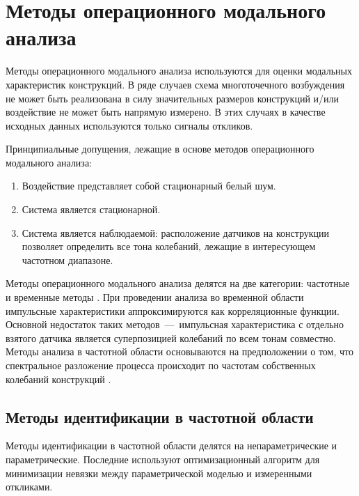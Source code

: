 \section{Методы операционного модального анализа}

Методы операционного модального анализа используются для оценки модальных характеристик конструкций. В ряде случаев схема многоточечного возбуждения не может быть реализована в силу значительных размеров конструкций и/или воздействие не может быть напрямую измерено. В этих случаях в качестве исходных данных используются только сигналы откликов. 

Принципиальные допущения, лежащие в основе методов операционного модального анализа:
\begin{enumerate}[noitemsep]
	\item Воздействие представляет собой стационарный белый шум.
	\item Система является стационарной.
	\item Система является наблюдаемой: расположение датчиков на конструкции позволяет определить все тона колебаний, лежащие в интересующем частотном диапазоне. 
\end{enumerate}

Методы операционного модального анализа делятся на две категории: частотные и временные методы \cite{lib:oma:Magalhaes}. При проведении анализа во временной области импульсные характеристики аппроксимируются как корреляционные функции. Основной недостаток таких методов~---~импульсная характеристика с отдельно взятого датчика является суперпозицией колебаний по всем тонам совместно. Методы анализа в частотной области основываются на предположении о том, что спектральное разложение процесса происходит по частотам собственных колебаний конструкций \cite{lib:oma:Brincker}. 

\subsection{Методы идентификации в частотной области}

Методы идентификации в частотной области  делятся на непараметрические и параметрические. Последние используют оптимизационный алгоритм для минимизации невязки между параметрической моделью и измеренными откликами. 

